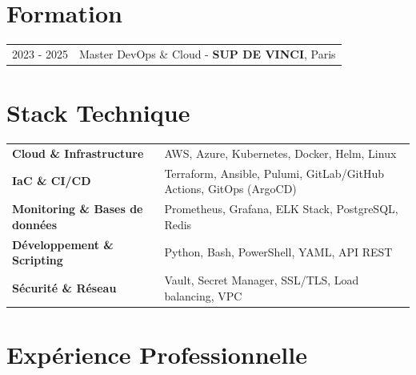 \documentclass[a4paper,11pt]{article}
\begin{document}
\section{Formation}
\begin{tabularx}{\linewidth}{@{}l X@{}}	
2023 - 2025 & Master DevOps \& Cloud - \textbf{SUP DE VINCI}, Paris \\
\end{tabularx}


\section{Stack Technique}
\begin{tabularx}{\linewidth}{@{}l X@{}}
\textbf{Cloud \& Infrastructure} & AWS, Azure, Kubernetes, Docker, Helm, Linux \\[3pt]
\textbf{IaC \& CI/CD} & Terraform, Ansible, Pulumi, GitLab/GitHub Actions, GitOps (ArgoCD) \\[3pt]
\textbf{Monitoring \& Bases de données} & Prometheus, Grafana, ELK Stack, PostgreSQL, Redis \\[3pt]
\textbf{Développement \& Scripting} & Python, Bash, PowerShell, YAML, API REST \\[3pt]
\textbf{Sécurité \& Réseau} & Vault, Secret Manager, SSL/TLS, Load balancing, VPC\\[3pt]
\end{tabularx}


\section{Expérience Professionnelle}
\end{document}

